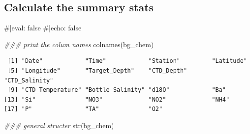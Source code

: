 \documentclass[
  letterpaper,
  DIV=11,
  numbers=noendperiod]{scrartcl}
\newenvironment{Shaded}{\begin{snugshade}}{\end{snugshade}}
\newcommand{\CommentTok}[1]{\textcolor[rgb]{0.37,0.37,0.37}{#1}}
\newcommand{\DocumentationTok}[1]{\textcolor[rgb]{0.37,0.37,0.37}{\textit{#1}}}
\newcommand{\FunctionTok}[1]{\textcolor[rgb]{0.28,0.35,0.67}{#1}}
\newcommand{\NormalTok}[1]{\textcolor[rgb]{0.00,0.23,0.31}{#1}}
\begin{document}
\subsection{Calculate the summary
stats}\label{calculate-the-summary-stats}

\begin{Shaded}
\begin{Highlighting}[]
\CommentTok{\#|eval: false}
\CommentTok{\#|echo: false}

\DocumentationTok{\#\#\# print the colum names}
\FunctionTok{colnames}\NormalTok{(bg\_chem)}
\end{Highlighting}
\end{Shaded}

\begin{verbatim}
 [1] "Date"            "Time"            "Station"         "Latitude"       
 [5] "Longitude"       "Target_Depth"    "CTD_Depth"       "CTD_Salinity"   
 [9] "CTD_Temperature" "Bottle_Salinity" "d18O"            "Ba"             
[13] "Si"              "NO3"             "NO2"             "NH4"            
[17] "P"               "TA"              "O2"             
\end{verbatim}

\begin{Shaded}
\begin{Highlighting}[]
\DocumentationTok{\#\#\# general structer}
\FunctionTok{str}\NormalTok{(bg\_chem)}
\end{Highlighting}
\end{Shaded}
\end{document}
